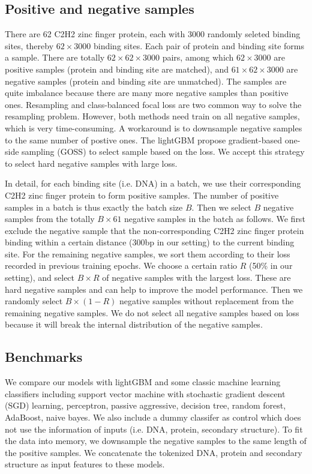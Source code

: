 \documentclass{article}
\begin{document}
\subsection{Positive and negative samples}
There are 62 C2H2 zinc finger protein, each with 3000 randomly seleted binding sites, thereby $62\times 3000$ binding sites. Each pair of protein and binding site forms a sample. There are totally $62\times 62\times 3000$ pairs, among which $62\times 3000$ are positive samples (protein and binding site are matched), and $61\times 62\times 3000$ are negative samples (protein and binding site are unmatched). The samples are quite imbalance because there are many more negative samples than positive ones. Resampling and class-balanced focal loss are two common way to solve the resampling problem. However, both methods need train on all negative samples, which is very time-consuming. A workaround is to downsample negative samples to the same number of postive ones. The lightGBM propose gradient-based one-side sampling (GOSS) to select sample based on the loss\cite{NIPS2017_6449f44a}. We accept this strategy to select hard negative samples with large loss.

In detail, for each binding site (i.e. DNA) in a batch, we use their corresponding C2H2 zinc finger protein to form positive samples. The number of positive samples in a batch is thus exactly the batch size $B$. Then we select $B$ negative samples from the totally $B\times 61$ negative samples in the batch as follows. We first exclude the negative sample that the non-corresponding C2H2 zinc finger protein binding within a certain distance (300bp in our setting) to the current binding site. For the remaining negative samples, we sort them according to their loss recorded in previous training epochs. We choose a certain ratio $R$ (50\% in our setting), and select $B\times R$ of negative samples with the largest loss. These are hard negative samples and can help to improve the model performance. Then we randomly select $B\times (1-R)$ negative samples without replacement from the remaining negative samples. We do not select all negative samples based on loss because it will break the internal distribution of the negative samples.

\subsection{Benchmarks}
We compare our models with lightGBM and some classic machine learning classifiers including support vector machine with stochastic gradient descent (SGD) learning, perceptron, passive aggressive, decision tree, random forest, AdaBoost, naive bayes. We also include a dummy classifer as control which does not use the information of inputs (i.e. DNA, protein, secondary structure). To fit the data into memory, we downsample the negative samples to the same length of the positive samples. We concatenate the tokenized DNA, protein and secondary structure as input features to these models.
\end{document}

